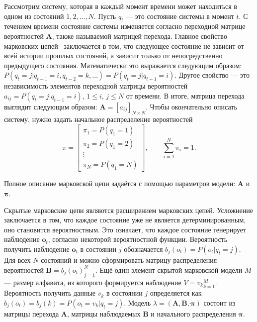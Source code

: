 Рассмотрим систему, которая в каждый момент времени может находиться в одном из состояний $1, 2, \dots, N$.
Пусть $q_t$ --- это состояние системы в момент $t$.
С течением времени состояние системы изменяется согласно переходной матрице вероятностей $\pmb{A}$, также называемой матрицей перехода.
Главное свойство марковских цепей~\cite{nikolenko2012} заключается в том, что следующее состояние не зависит от всей истории прошлых состояний, а зависит только от непосредственно предыдущего состояния.
Математически это выражается следующим образом: $P(q_t = j | q_{t-1} = i, q_{t-2} = k, \dots)= P(q_t = j | q_{t-1} = i)$.
Другое свойство --- это независимость элементов переходной матрицы вероятностей $a_{ij} = P(q_t = j | q_{t-1} = i)$, $1 \le i$, $j \le N$ от времени.
В итоге, матрица перехода выглядит следующим образом: $\pmb{A} = [a_{ij}]_{N \times N}$.
Чтобы окончательно описать систему, нужно задать начальное распределение вероятностей 
\begin{equation}
\pi =
\begin{bmatrix}
\pi_1 = P(q_1 = 1) \\
\pi_2 = P(q_1 = 2) \\
\vdots \\
\pi_N = P(q_1 = N)
\end{bmatrix}
,\qquad
\sum_{i=1}^N \pi_i = 1.
\end{equation}

Полное описание марковской цепи задаётся с помощью параметров модели: $\pmb{A}$ и $\pmb{\pi}$.

Скрытые марковские цепи являются расширением марковских цепей.
Усложнение заключается в том, что каждое состояние уже не является детерминированным, оно становится вероятностным.
Это означает, что каждое состояние генерирует наблюдение $\pmb{o}_t$, согласно некоторой вероятностной функции.
Вероятность получить наблюдение $\pmb{o}_t$ в состоянии $j$ обозначается $b_j (o_t) = P(o_t | q_t = j)$.
Для всех $N$ состояний и можно сформировать матрицу распределения вероятностей $\pmb{B} = {b_j (o_t)}_{j=1}^N$.
Ещё один элемент скрытой марковской модели $M$ --- размер алфавита, из которого формируется наблюдение $V = {v_k}_{k=1}^M$.
Вероятность получить данные $v_k$ в состоянии $j$ определяется как $b_j (o_t) = b_j (k) = P(o_t = v_k | q_t = j)$.
Модель $\lambda=(\pmb{A}, \pmb{B}, \pmb{\pi})$ состоит из матрицы перехода $\pmb{A}$, матрицы наблюдаемых ${\pmb{B}}$ и начального распределения $\pmb{\pi}$.

